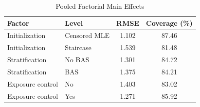 \begin{table}[htbp]
\centering
\small
\caption{Pooled Factorial Main Effects}
\label{tab:robustness-factorial-effects}
\begin{tabular}{llcc}
\toprule
Factor & Level & RMSE & Coverage (\%) \\
\midrule
Initialization & Censored MLE & 1.102 & 87.46 \\
Initialization & Staircase & 1.539 & 81.48 \\
Stratification & No BAS & 1.301 & 84.72 \\
Stratification & BAS & 1.375 & 84.21 \\
Exposure control & No & 1.403 & 83.02 \\
Exposure control & Yes & 1.271 & 85.92 \\
\bottomrule
\end{tabular}
\end{table}
